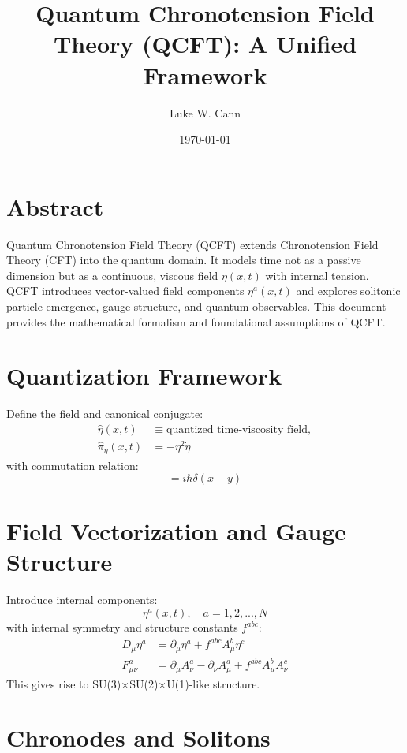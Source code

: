 \documentclass[12pt]{article}
\title{Quantum Chronotension Field Theory (QCFT): A Unified Framework}
\author{Luke W. Cann}
\date{\today}
\begin{document}
\maketitle

\section*{Abstract}
Quantum Chronotension Field Theory (QCFT) extends Chronotension Field Theory (CFT) into the quantum domain. It models time not as a passive dimension but as a continuous, viscous field $\eta(x,t)$ with internal tension. QCFT introduces vector-valued field components $\eta^a(x,t)$ and explores solitonic particle emergence, gauge structure, and quantum observables. This document provides the mathematical formalism and foundational assumptions of QCFT.

\section{Quantization Framework}

Define the field and canonical conjugate:
\begin{align}
\hat{\eta}(x,t) &\equiv \text{quantized time-viscosity field}, \\
\hat{\pi}_\eta(x,t) &= -\eta^2 \dot{\eta}
\end{align}
with commutation relation:
\begin{equation}
[\hat{\eta}(x), \hat{\pi}_\eta(y)] = i\hbar \delta(x - y)
\end{equation}

\section{Field Vectorization and Gauge Structure}

Introduce internal components:
\begin{equation}
\eta^a(x,t), \quad a = 1,2,...,N
\end{equation}
with internal symmetry and structure constants $f^{abc}$:
\begin{align}
D_\mu \eta^a &= \partial_\mu \eta^a + f^{abc} A_\mu^b \eta^c \\
F_{\mu\nu}^a &= \partial_\mu A_\nu^a - \partial_\nu A_\mu^a + f^{abc} A_\mu^b A_\nu^c
\end{align}
This gives rise to SU(3)×SU(2)×U(1)-like structure.

\section{Chronodes and Solitons}
\end{document}
